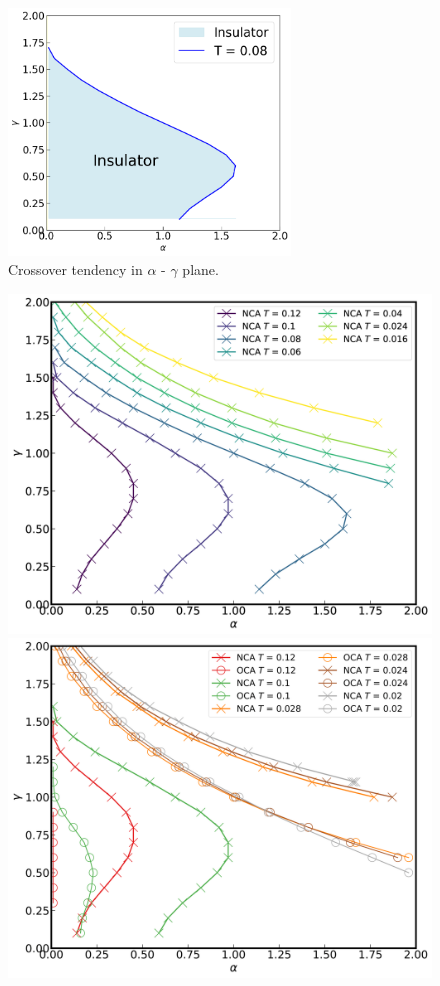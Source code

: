 \documentclass{article}[12pt]
\begin{document}
\begin{spacing}{1.5}
\begin{figure}[H]
  \centerline{\includegraphics[width=7.5cm]{TexFigure/4/4_3_07_Simplefig.png}}
  \caption{Crossover tendency in $\alpha$ - $\gamma$ plane.}
\end{figure}
\pagebreak
\newpage
\begin{figure}[H]
  \centerline{\includegraphics[width=12cm]{TexFigure/4/4_3_08_3dplot_Ns3_proj_n-1.png}}
  \centerline{\includegraphics[width=12cm]{TexFigure/4/4_3_09_3dplot_COMP3_proj_n-1.png}}

\end{figure}
\end{spacing}
\end{document}
